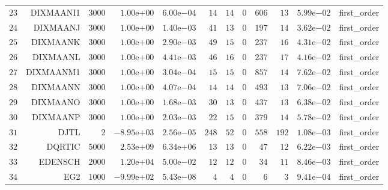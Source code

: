 \begin{longtable}{rrrrrrrrrrrr}
  \(    23\) & DIXMAANI1 & \(  3000\) & \( 1.00\)e\(+00\) & \( 6.00\)e\(-04\) & \(    14\) & \(    14\) & \(     0\) & \(   606\) & \(    13\) & \( 5.99\)e\(-02\) & first\_order \\
  \(    24\) & DIXMAANJ & \(  3000\) & \( 1.00\)e\(+00\) & \( 1.40\)e\(-03\) & \(    41\) & \(    13\) & \(     0\) & \(   197\) & \(    14\) & \( 3.62\)e\(-02\) & first\_order \\
  \(    25\) & DIXMAANK & \(  3000\) & \( 1.00\)e\(+00\) & \( 2.90\)e\(-03\) & \(    49\) & \(    15\) & \(     0\) & \(   237\) & \(    16\) & \( 4.31\)e\(-02\) & first\_order \\
  \(    26\) & DIXMAANL & \(  3000\) & \( 1.00\)e\(+00\) & \( 4.41\)e\(-03\) & \(    46\) & \(    16\) & \(     0\) & \(   237\) & \(    17\) & \( 4.16\)e\(-02\) & first\_order \\
  \(    27\) & DIXMAANM1 & \(  3000\) & \( 1.00\)e\(+00\) & \( 3.04\)e\(-04\) & \(    15\) & \(    15\) & \(     0\) & \(   857\) & \(    14\) & \( 7.62\)e\(-02\) & first\_order \\
  \(    28\) & DIXMAANN & \(  3000\) & \( 1.00\)e\(+00\) & \( 4.07\)e\(-04\) & \(    14\) & \(    14\) & \(     0\) & \(   493\) & \(    13\) & \( 7.06\)e\(-02\) & first\_order \\
  \(    29\) & DIXMAANO & \(  3000\) & \( 1.00\)e\(+00\) & \( 1.68\)e\(-03\) & \(    30\) & \(    13\) & \(     0\) & \(   437\) & \(    13\) & \( 6.38\)e\(-02\) & first\_order \\
  \(    30\) & DIXMAANP & \(  3000\) & \( 1.00\)e\(+00\) & \( 2.03\)e\(-03\) & \(    22\) & \(    15\) & \(     0\) & \(   379\) & \(    14\) & \( 5.78\)e\(-02\) & first\_order \\
  \(    31\) & DJTL & \(     2\) & \(-8.95\)e\(+03\) & \( 2.56\)e\(-05\) & \(   248\) & \(    52\) & \(     0\) & \(   558\) & \(   192\) & \( 1.08\)e\(-03\) & first\_order \\
  \(    32\) & DQRTIC & \(  5000\) & \( 2.53\)e\(+09\) & \( 6.34\)e\(+06\) & \(    13\) & \(    13\) & \(     0\) & \(    47\) & \(    12\) & \( 6.22\)e\(-03\) & first\_order \\
  \(    33\) & EDENSCH & \(  2000\) & \( 1.20\)e\(+04\) & \( 5.00\)e\(-02\) & \(    12\) & \(    12\) & \(     0\) & \(    34\) & \(    11\) & \( 8.46\)e\(-03\) & first\_order \\
  \(    34\) & EG2 & \(  1000\) & \(-9.99\)e\(+02\) & \( 5.43\)e\(-08\) & \(     4\) & \(     4\) & \(     0\) & \(     6\) & \(     3\) & \( 9.41\)e\(-04\) & first\_order \\

\end{longtable}
